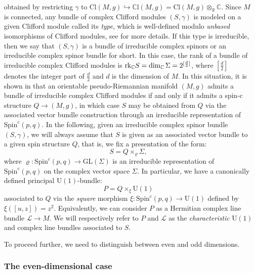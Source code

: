 \documentclass[10pt,a4paper,twoside,reqno]{amsart}
\theoremstyle{plain}
\theoremstyle{definition}
\theoremstyle{remark}
\def\C{\mathbb{C}}
\def\R{\mathbb{R}}
\def\rk{{\rm rk}}
\def\Spin{\mathrm{Spin}}
\def\Spin{\mathrm{Spin}}
\def\U{\mathrm{U}}
\def\R{\mathbb{R}}
\def\mCl{\mathbb{C}\mathrm{l}}
\def\cL{\mathcal{L}}
\begin{document}
obtained by restricting $\gamma$ to $\mathrm{Cl}(M,g) \hookrightarrow \mCl(M,g) = \mathrm{Cl}(M,g)\otimes_{\R}\mathbb{C}$. Since $M$ is connected, any bundle of complex Clifford modules $(S,\gamma)$ is modeled on a given Clifford module called its \emph{type}, which is well-defined modulo \emph{unbased} isomorphisms of Clifford modules, see \cite{LS18,LS19} for more details. If this type is irreducible, then we say that $(S,\gamma)$ is a bundle of irreducible complex spinors or an irreducible complex spinor bundle for short. In this case, the rank of a bundle of irreducible complex Clifford modules is $\rk_\C S=\dim_\C\Sigma=2^{\smash{[\frac{d}{2}]}}$, where $[\frac{d}{2}]$ denotes the integer part of $\frac{d}{2}$ and $d$ is the dimension of $M$. In this situation, it is shown in \cite{LS18,LS19,LS22_complex_type} that an orientable pseudo-Riemannian manifold $(M,g)$ admits a bundle of irreducible complex Clifford modules if and only if it admits a spin-c structure $Q \to (M,g)$, in which case $S$ may be obtained from $Q$ via the associated vector bundle construction through an irreducible representation of $\Spin^c(p,q)$. In the following, given an irreducible complex spinor bundle $(S,\gamma)$, we will always assume that $S$ is given as an associated vector bundle to a given spin structure $Q$, that is, we fix a presentation of the form:
\begin{equation*}
S = Q\times_{\varrho} \Sigma,
\end{equation*}
where $\varrho\colon \Spin^c(p,q)\to \mathrm{GL}(\Sigma)$ is an irreducible representation of $\Spin^c(p,q)$ on the complex vector space $\Sigma$. In particular, we have a canonically defined principal $\U(1)$-bundle:
\begin{equation*}
P = Q\times_{\xi} \U(1)
\end{equation*}
associated to $Q$ via the \emph{square} morphism $\xi \colon \Spin^c(p,q) \to \U(1)$ defined by $\xi([u,z])=z^2$. Equivalently, we can consider $P$ as a Hermitian complex line bundle $\cL\to M$. We will respectively refer to $P$ and $\cL$ as the \emph{characteristic} $\U(1)$ and complex line bundles associated to $S$.\medskip

To proceed further, we need to distinguish between even and odd dimensions.


\subsubsection{The even-dimensional case}
\end{document}
